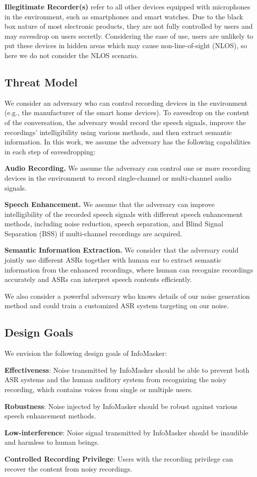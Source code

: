 \textbf{Illegitimate Recorder(s) }refer to all other devices equipped with microphones in the environment, such as smartphones and smart watches. Due to the black box nature of most electronic products, they are not fully controlled by users and may eavesdrop on users secretly. Considering the ease of use, users are unlikely to put these devices in hidden areas which may cause non-line-of-sight (NLOS), so here we do not consider the NLOS scenario.

\subsection{Threat Model}
We consider an adversary who can control recording devices in the environment (e.g., the manufacturer of the smart home devices). To eavesdrop on the content of the conversation, the adversary would record the speech signals, improve the recordings' intelligibility using various methods, and then extract semantic information. In this work, we assume the adversary has the following capabilities in each step of eavesdropping:

\textbf{Audio Recording. }We assume the adversary can control one or more recording devices in the environment to record single-channel or multi-channel audio signals.

\textbf{Speech Enhancement.}
We assume that the adversary can improve intelligibility of the recorded speech signals with different speech enhancement methods, including noise reduction, speech separation, and Blind Signal Separation (BSS) if multi-channel recordings are acquired.

\textbf{Semantic Information Extraction. }We consider that the adversary could jointly use different ASRs together with human ear to extract semantic information from the enhanced recordings, where human can recognize recordings accurately and ASRs can interpret speech contents efficiently. 

We also consider a powerful adversary who knows details of our noise generation method and could train a customized ASR system targeting on our noise.


\subsection{Design Goals}
We envision the following design goals of InfoMasker:

\textbf{Effectiveness}: 
Noise transmitted by InfoMasker should be able to prevent both ASR systems and the human auditory system from recognizing the noisy recording, which contains voices from single or multiple users.

\textbf{Robustness}: Noise injected by InfoMasker should be robust against various speech enhancement methods.

\textbf{Low-interference}: Noise signal transmitted by InfoMasker should be inaudible and harmless to human beings.

\textbf{Controlled Recording Privilege}: Users with the recording privilege can recover the content from noisy recordings.
